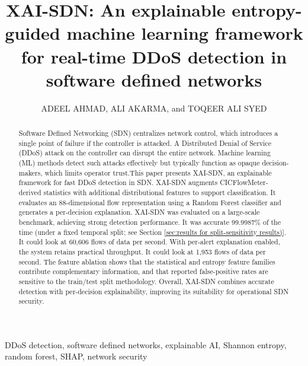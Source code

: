 \documentclass{ieeeaccess}
\begin{document}
\title{XAI-SDN: An explainable entropy-guided machine learning framework for real-time DDoS detection in software defined networks}

\author{\uppercase{Adeel Ahmad},
\uppercase{Ali Akarma}, and \uppercase{Toqeer Ali Syed}}

\address[1]{AI Center, Faculty of Computer and Information Systems, Islamic University of Madinah, Madinah 42351, Saudi Arabia}
\address[2]{AI V\&V Lab, King Fahd University of Petroleum and Minerals, Dhahran, Saudi Arabia}

\begin{abstract}
Software Defined Networking (SDN) centralizes network control, which introduces a single point of failure if the controller is attacked. A Distributed Denial of Service (DDoS) attack on the controller can disrupt the entire network. Machine learning (ML) methods detect such attacks effectively but typically function as opaque decision-makers, which limits operator trust.This paper presents XAI-SDN, an explainable framework for fast DDoS detection in SDN. XAI-SDN augments CICFlowMeter-derived statistics with additional distributional features to support classification. It evaluates an 88-dimensional flow representation using a Random Forest classifier and generates a per-decision explanation.
XAI-SDN was evaluated on a large-scale benchmark, achieving strong detection performance. It was accurate 99.9987\% of the time (under a fixed temporal split; see Section \ref{sec:results for split-sensitivity results)}. It could look at 60,606 flows of data per second. With per-alert explanation enabled, the system retains practical throughput. It could look at 1,953 flows of data per second. The feature ablation shows that the statistical and entropy feature families contribute complementary information, and that reported false-positive rates are sensitive to the train/test split methodology. Overall, XAI-SDN combines accurate detection with per-decision explainability, improving its suitability for operational SDN security.
\end{abstract}

\begin{keywords}
DDoS detection, software defined networks, explainable AI, Shannon entropy, random forest, SHAP, network security
\end{keywords}
\end{document}
